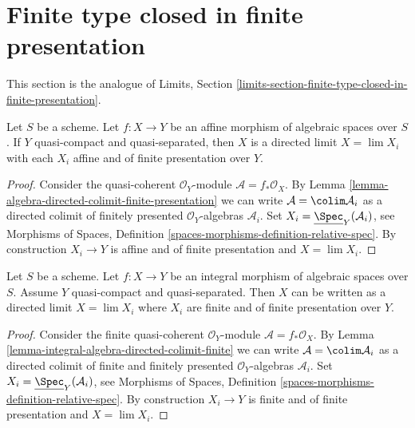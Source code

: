 \section{Finite type closed in finite presentation}
\label{section-finite-type-closed-in-finite-presentation}

\noindent
This section is the analogue of
Limits, Section \ref{limits-section-finite-type-closed-in-finite-presentation}.

\begin{lemma}
\label{lemma-affine-morphism-is-limit}
Let $S$ be a scheme. Let $f : X \to Y$ be an affine morphism of algebraic
spaces over $S$. If $Y$ quasi-compact and
quasi-separated, then $X$ is a directed limit $X = \lim X_i$
with each $X_i$ affine and of finite presentation over $Y$.
\end{lemma}

\begin{proof}
Consider the quasi-coherent $\mathcal{O}_Y$-module
$\mathcal{A} = f_*\mathcal{O}_X$. By
Lemma \ref{lemma-algebra-directed-colimit-finite-presentation}
we can write $\mathcal{A} = \colim \mathcal{A}_i$ as a directed
colimit of finitely presented
$\mathcal{O}_Y$-algebras $\mathcal{A}_i$.
Set $X_i = \underline{\Spec}_Y(\mathcal{A}_i)$, see
Morphisms of Spaces, Definition
\ref{spaces-morphisms-definition-relative-spec}.
By construction $X_i \to Y$ is affine and of finite presentation
and $X = \lim X_i$.
\end{proof}

\begin{lemma}
\label{lemma-integral-limit-finite-and-finite-presentation}
Let $S$ be a scheme. Let $f : X \to Y$ be an integral morphism of algebraic
spaces over $S$. Assume $Y$ quasi-compact and quasi-separated.
Then $X$ can be written as a directed limit $X = \lim X_i$
where $X_i$ are finite and of finite presentation over $Y$.
\end{lemma}

\begin{proof}
Consider the finite quasi-coherent $\mathcal{O}_Y$-module
$\mathcal{A} = f_*\mathcal{O}_X$. By
Lemma \ref{lemma-integral-algebra-directed-colimit-finite}
we can write $\mathcal{A} = \colim \mathcal{A}_i$ as a directed
colimit of finite and finitely presented $\mathcal{O}_Y$-algebras
$\mathcal{A}_i$.
Set $X_i = \underline{\Spec}_Y(\mathcal{A}_i)$, see
Morphisms of Spaces, Definition
\ref{spaces-morphisms-definition-relative-spec}.
By construction $X_i \to Y$ is finite and of finite presentation and
$X = \lim X_i$.
\end{proof}

